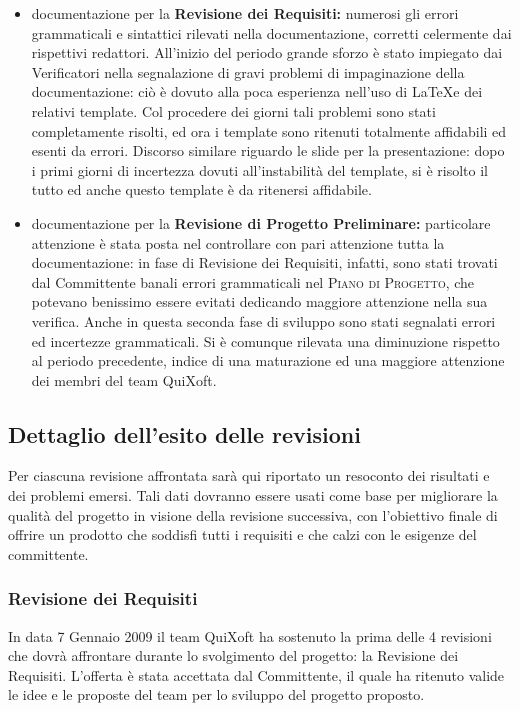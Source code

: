 \documentclass[11pt,a4paper]{article}
\begin{document}
\begin{itemize}
 \item documentazione per la \textbf{Revisione dei Requisiti:} numerosi gli errori grammaticali e sintattici rilevati nella documentazione, corretti celermente dai rispettivi redattori. All'inizio del periodo grande sforzo è stato impiegato dai Verificatori nella segnalazione di gravi problemi di impaginazione della documentazione: ciò è dovuto alla poca esperienza nell'uso di \LaTeX \space e dei relativi template. Col procedere dei giorni tali problemi sono stati completamente risolti, ed ora i template sono ritenuti totalmente affidabili ed esenti da errori. Discorso similare riguardo le slide per la presentazione: dopo i primi giorni di incertezza dovuti all'instabilità del template, si è risolto il tutto ed anche questo template è da ritenersi affidabile.
 \item documentazione per la \textbf{Revisione di Progetto Preliminare:} particolare attenzione è stata posta nel controllare con pari attenzione tutta la documentazione: in fase di Revisione dei Requisiti, infatti, sono stati trovati dal Committente banali errori grammaticali nel \textsc{Piano di Progetto}, che potevano benissimo essere evitati dedicando maggiore attenzione nella sua verifica. Anche in questa seconda fase di sviluppo sono stati segnalati errori ed incertezze grammaticali. Si è comunque rilevata una diminuzione rispetto al periodo precedente, indice di una maturazione ed una maggiore attenzione dei membri del team QuiXoft.
\end{itemize}
\subsection{Dettaglio dell'esito delle revisioni}
Per ciascuna revisione affrontata sarà qui riportato un resoconto dei risultati e dei problemi emersi. Tali dati dovranno essere usati come base per migliorare la qualità del progetto in visione della revisione successiva, con l'obiettivo finale di offrire un prodotto che soddisfi tutti i requisiti e che calzi con le esigenze del committente.
\subsubsection{Revisione dei Requisiti}
In data 7 Gennaio 2009 il team QuiXoft ha sostenuto la prima delle 4 revisioni che dovrà affrontare durante lo svolgimento del progetto: la Revisione dei Requisiti.
L'offerta è stata accettata dal Committente, il quale ha ritenuto valide le idee e le proposte del team per lo sviluppo del progetto proposto.
\end{document}
